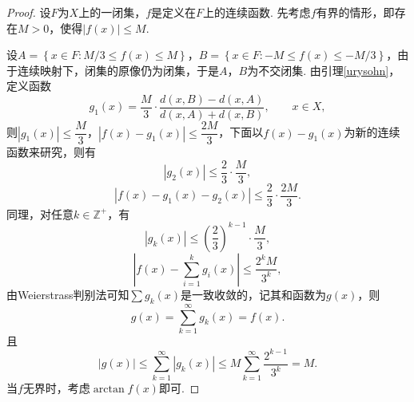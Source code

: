 \documentclass[12pt]{ctexart}
\theoremstyle{definition}
\theoremstyle{plain}
\begin{document}
	\begin{proof}
		设$F$为$X$上的一闭集，$f$是定义在$F$上的连续函数. 先考虑$f$有界的情形，即存在$M>0$，使得$|f(x)|\leqslant M$.
		
		设$A=\left\{x\in F:M/3 \leqslant f(x)\leqslant M\right\}$，$B=\left\{x\in F:-M\leqslant f(x)\leqslant -M/3\right\}$，由于连续映射下，闭集的原像仍为闭集，于是$A$，$B$为不交闭集. 由引理\ref{urysohn}，定义函数
		$$g_1(x)=\frac{M}{3}\cdot\frac{d(x,B)-d(x,A)}{d(x,A)+d(x,B)},\qquad x\in X,$$
		则$|g_1(x)|\leqslant \dfrac{M}{3}$，$|f(x)-g_1(x)|\leqslant\dfrac{2M}{3}$，下面以$f(x)-g_1(x)$为新的连续函数来研究，则有$$|g_2(x)|\leqslant \dfrac{2}{3}\cdot\dfrac{M}{3},$$
		$$|f(x)-g_1(x)-g_2(x)|\leqslant\dfrac{2}{3}\cdot\dfrac{2M}{3}.$$
		同理，对任意$k\in\mathbb{Z}^{+}$，有
		$$|g_k(x)|\leqslant\left(\frac{2}{3}\right)^{k-1}\cdot\frac{M}{3},$$
		$$\left|f(x)-\sum_{i=1}^{k}g_i(x)\right|\leqslant\frac{2^kM}{3^k},$$
		由Weierstrass判别法可知$\sum g_k(x)$是一致收敛的，记其和函数为$g(x)$，则
		$$g(x)=\sum_{k=1}^{\infty}g_k(x)=f(x).$$
		且
		$$|g(x)|\leqslant\sum_{k=1}^{\infty}|g_k(x)|\leqslant M\sum_{k=1}^{\infty}\frac{2^{k-1}}{3^k}=M.$$
		当$f$无界时，考虑$\arctan f(x)$即可.
	\end{proof}
\end{document}
